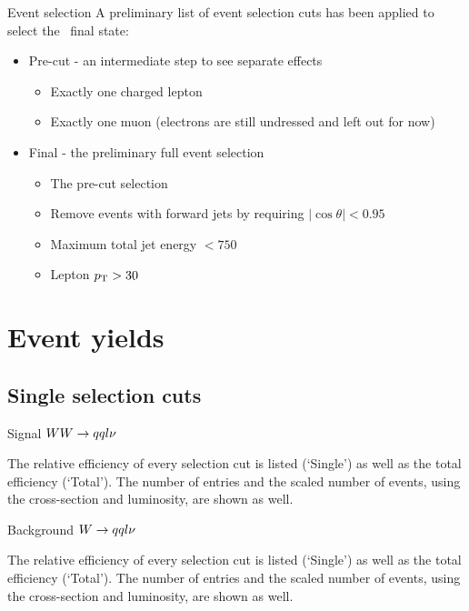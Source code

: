 \documentclass{beamer}
\newcommand{\texpath}{../analysis/tex/}
\begin{document}
\begin{frame}{Event selection}
A preliminary list of event selection cuts has been applied to select the \qqln\ final state:
\begin{itemize}
%
\item Pre-cut - an intermediate step to see separate effects
\begin{itemize}
\item Exactly one charged lepton
\item Exactly one muon (electrons are still undressed and left out for now)
\end{itemize}
%
\item Final - the preliminary full event selection
\begin{itemize}
\item The pre-cut selection
\item Remove events with forward jets by requiring $|\cos \theta| < 0.95$
\item Maximum total jet energy $< 750$~\GeV
\item Lepton $p_\mathrm{T} > 30$~\GeV
\end{itemize}
%
\end{itemize}
\end{frame}









\section{Event yields}

\subsection{Single selection cuts}

\begin{frame}{Signal $WW\rightarrow qql\nu$}

The relative efficiency of every selection cut is listed (`Single') as well as the total efficiency (`Total').
%
The number of entries and the scaled number of events, using the cross-section and luminosity, are shown as well.
\end{frame}

\begin{frame}{Background $W\rightarrow qql\nu$}

The relative efficiency of every selection cut is listed (`Single') as well as the total efficiency (`Total').
%
The number of entries and the scaled number of events, using the cross-section and luminosity, are shown as well.
\end{frame}
\end{document}
